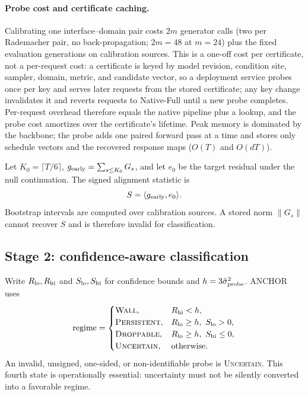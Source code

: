 \documentclass[letterpaper]{article}
\begin{document}
\paragraph{Probe cost and certificate caching.}
Calibrating one interface--domain pair costs $2m$ generator calls (two
per Rademacher pair, no back-propagation; $2m{=}48$ at $m{=}24$) plus
the fixed evaluation generations on calibration sources. This is a
one-off cost per certificate, not a per-request cost: a certificate is
keyed by model revision, condition site, sampler, domain, metric, and
candidate vector, so a deployment service probes once per key and
serves later requests from the stored certificate; any key change
invalidates it and reverts requests to Native-Full until a new probe
completes. Per-request overhead therefore equals the native pipeline
plus a lookup, and the probe cost amortizes over the certificate's
lifetime. Peak memory is dominated by the backbone; the probe adds one
paired forward pass at a time and stores only schedule vectors and the
recovered response maps ($O(T)$ and $O(dT)$).

Let $K_0=\lceil T/6\rceil$, $g_{\rm early}=\sum_{s\le K_0}G_s$, and let
$e_0$ be the target residual under the null continuation. The signed
alignment statistic is
\begin{equation}
S=\langle g_{\rm early},e_0\rangle .
\label{eq:alignment}
\end{equation}
Bootstrap intervals are computed over calibration sources. A stored norm
$\|G_s\|$ cannot recover $S$ and is therefore invalid for classification.

\subsection{Stage 2: confidence-aware classification}
Write $R_{\rm lo},R_{\rm hi}$ and $S_{\rm lo},S_{\rm hi}$ for confidence
bounds and $h=3\hat\sigma^2_{\rm probe}$. ANCHOR uses
\begin{equation}
\mathrm{regime}=\begin{cases}
\textsc{Wall}, & R_{\rm hi}<h,\\
\textsc{Persistent}, & R_{\rm lo}\ge h,\ S_{\rm lo}>0,\\
\textsc{Droppable}, & R_{\rm lo}\ge h,\ S_{\rm hi}\le0,\\
\textsc{Uncertain}, & \text{otherwise.}
\end{cases}
\label{eq:classify}
\end{equation}
An invalid, unsigned, one-sided, or non-identifiable probe is
\textsc{Uncertain}. This fourth state is operationally essential: uncertainty
must not be silently converted into a favorable regime.
\end{document}
